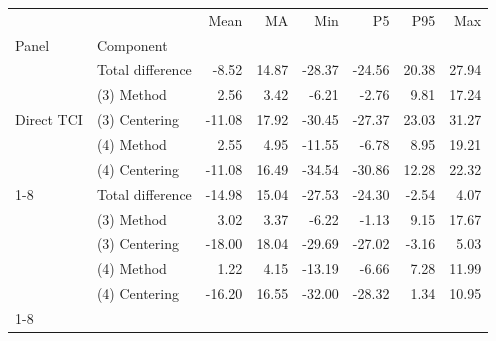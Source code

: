 \begin{tabular}{llrrrrrr}
\toprule
 &  & Mean & MA & Min & P5 & P95 & Max \\
Panel & Component &  &  &  &  &  &  \\
\midrule
\multirow[t]{5}{*}{Direct TCI} & Total difference & -8.52 & 14.87 & -28.37 & -24.56 & 20.38 & 27.94 \\
 & (3) Method & 2.56 & 3.42 & -6.21 & -2.76 & 9.81 & 17.24 \\
 & (3) Centering & -11.08 & 17.92 & -30.45 & -27.37 & 23.03 & 31.27 \\
 & (4) Method & 2.55 & 4.95 & -11.55 & -6.78 & 8.95 & 19.21 \\
 & (4) Centering & -11.08 & 16.49 & -34.54 & -30.86 & 12.28 & 22.32 \\
\cline{1-8}
\multirow[t]{5}{*}{Reverse TCI} & Total difference & -14.98 & 15.04 & -27.53 & -24.30 & -2.54 & 4.07 \\
 & (3) Method & 3.02 & 3.37 & -6.22 & -1.13 & 9.15 & 17.67 \\
 & (3) Centering & -18.00 & 18.04 & -29.69 & -27.02 & -3.16 & 5.03 \\
 & (4) Method & 1.22 & 4.15 & -13.19 & -6.66 & 7.28 & 11.99 \\
 & (4) Centering & -16.20 & 16.55 & -32.00 & -28.32 & 1.34 & 10.95 \\
\cline{1-8}
\bottomrule
\end{tabular}
